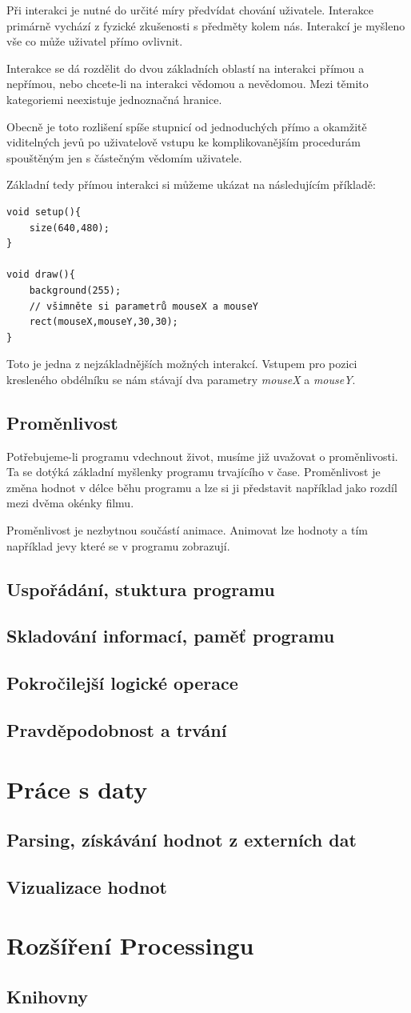 \documentclass[10pt,twopage]{book}
\newcommand{\oddil}[1]{\section{#1}\label{sec:#1}}
\newcommand{\vyraz}[1]{\textit{\gls{#1}}\index{#1}}
\begin{document}
Při interakci je nutné do určité míry předvídat chování uživatele. Interakce primárně vychází z fyzické zkušenosti s předměty kolem nás. Interakcí je myšleno vše co může uživatel přímo ovlivnit.

Interakce se dá rozdělit do dvou základních oblastí na interakci přímou a nepřímou, nebo chcete-li na interakci vědomou a nevědomou. Mezi těmito kategoriemi neexistuje jednoznačná hranice.

Obecně je toto rozlišení spíše stupnicí od jednoduchých přímo a okamžitě viditelných jevů po uživatelově vstupu ke komplikovanějším procedurám spouštěným jen s částečným vědomím uživatele.

Základní tedy přímou interakci si můžeme ukázat na následujícím příkladě:

\begin{lstlisting}
void setup(){
	size(640,480);
}

void draw(){
	background(255);
	// všimněte si parametrů mouseX a mouseY
	rect(mouseX,mouseY,30,30);
}
\end{lstlisting}

Toto je jedna z nejzákladnějších možných interakcí. Vstupem pro pozici kresleného obdélníku se nám stávají dva parametry \vyraz{mouseX} a \vyraz{mouseY}.


\oddil{Proměnlivost}

Potřebujeme-li programu vdechnout život, musíme již uvažovat o proměnlivosti. Ta se dotýká základní myšlenky programu trvajícího v čase. Proměnlivost je změna hodnot v délce běhu programu a lze si ji představit například jako rozdíl mezi dvěma okénky filmu.

Proměnlivost je nezbytnou součástí animace. Animovat lze hodnoty a tím například jevy které se v programu zobrazují.


\oddil{Uspořádání, stuktura programu}
\oddil{Skladování informací, paměť programu}
\oddil{Pokročilejší logické operace}

\oddil{Pravděpodobnost a trvání}

\chapter{Práce s daty}

\oddil{Parsing, získávání hodnot z externích dat}
\oddil{Vizualizace hodnot}


\chapter{Rozšíření Processingu}
\oddil{Knihovny}
\end{document}
